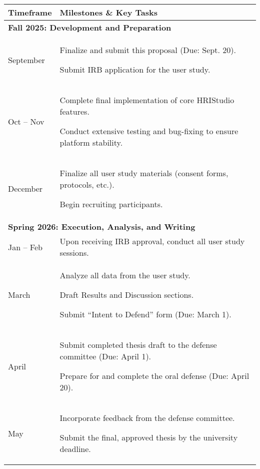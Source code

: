 \documentclass[numbib]{buthesis_p}  %
\begin{document}
\begin{table}[h!]
\centering
\renewcommand{\arraystretch}{1.5}
\begin{tabularx}{\textwidth}{|l|X|}
\hline
\textbf{Timeframe} & \textbf{Milestones \& Key Tasks} \\
\hline
\multicolumn{2}{|l|}{\textbf{Fall 2025: Development and Preparation}} \\
\hline
September & Finalize and submit this proposal (Due: Sept. 20).

Submit IRB application for the user study. \\
\hline
Oct -- Nov & Complete final implementation of core HRIStudio features.

Conduct extensive testing and bug-fixing to ensure platform stability. \\
\hline
December & Finalize all user study materials (consent forms, protocols, etc.).

Begin recruiting participants. \\
\hline
\multicolumn{2}{|l|}{\textbf{Spring 2026: Execution, Analysis, and Writing}} \\
\hline
Jan -- Feb & Upon receiving IRB approval, conduct all user study sessions. \\
\hline
March & Analyze all data from the user study.

Draft Results and Discussion sections.

Submit ``Intent to Defend'' form (Due: March 1). \\
\hline
April & Submit completed thesis draft to the defense committee (Due: April 1).

Prepare for and complete the oral defense (Due: April 20). \\
\hline
May & Incorporate feedback from the defense committee.

Submit the final, approved thesis by the university deadline. \\
\hline
\end{tabularx}
\end{table}
\end{document}
